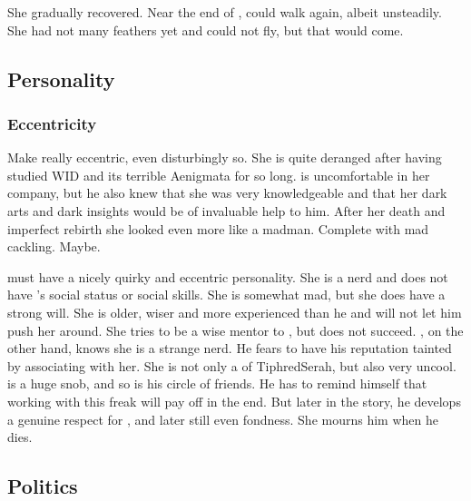 She gradually recovered. 
Near the end of \TwilightAngelRememberEmph, \Urizeth could walk again, albeit unsteadily.
She had not many feathers yet and could not fly, but that would come.









\subsection{Personality}





\subsubsection{Eccentricity}
Make \Urizeth really eccentric, even disturbingly so.
She is quite deranged after having studied WID and its terrible Aenigmata for so long.
\Teshrial is uncomfortable in her company, but he also knew that she was very knowledgeable and that her dark arts and dark insights would be of invaluable help to him.
After her death and imperfect rebirth she looked even more like a madman. 
Complete with mad cackling.
Maybe.

\Urizeth must have a nicely quirky and eccentric personality.
She is a nerd and does not have \Teshrial's social status or social skills.
She is somewhat mad, but she does have a strong will. 
She is older, wiser and more experienced than he and will not let him push her around.
She tries to be a wise mentor to \Teshrial, but does not succeed.
\Teshrial, on the other hand, knows she is a strange nerd.
He fears to have his reputation tainted by associating with her.
She is not only a \thelyad of TiphredSerah, but also very uncool.
\Teshrial is a huge snob, and so is his circle of friends.
He has to remind himself that working with this freak will pay off in the end.
But later in the story, he develops a genuine respect for \Urizeth, and later still even fondness.
She mourns him when he dies.









\subsection{Politics}





